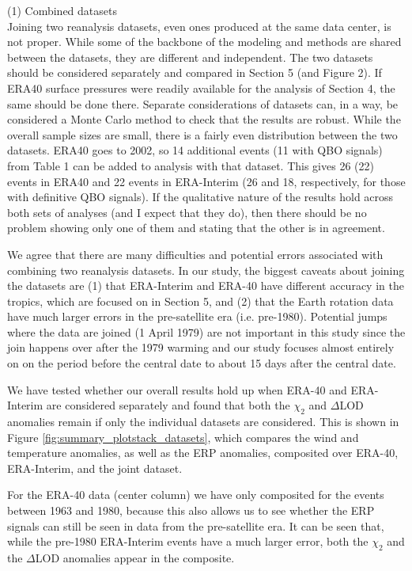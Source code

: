 \documentclass[a4paper,10pt]{article}
\begin{document}
\noindent \textcolor{reviewer}{(1) Combined datasets \\
Joining two reanalysis datasets, even ones produced at the same data center, is not proper. While some of the backbone of the modeling and methods are shared between the datasets, they are different and independent. The two datasets should be considered separately and compared in Section 5 (and Figure 2). If ERA40 surface pressures were readily available for the analysis of Section 4, the same should be done there. Separate considerations of datasets can, in a way, be considered a Monte Carlo method to check that the results are robust. While the overall sample sizes are small, there is a fairly even distribution between the two datasets. ERA40 goes to 2002, so 14 additional events (11 with QBO signals) from Table 1 can be added to analysis with that dataset. This gives 26 (22) events in ERA40 and 22 events in ERA-Interim (26 and 18, respectively, for those with definitive QBO signals). If the qualitative nature of the results hold across both sets of analyses (and I expect that
they do), then there should be no problem showing only one of them and stating that the other is in agreement.}
\vspace{0.5cm}

We agree that there are many difficulties and potential errors associated with combining two reanalysis datasets.
In our study, the biggest caveats about joining the datasets are (1) that ERA-Interim and ERA-40 have different accuracy in the tropics, which are focused on in Section 5, and (2) that the Earth rotation data have much larger errors in the pre-satellite era (i.e. pre-1980).  Potential jumps where the data are joined (1 April 1979) are not important in this study since the join happens over after the 1979 warming and our study focuses almost entirely on on the period before the central date to about 15 days after the central date.  

We have tested whether our overall results hold up when ERA-40 and ERA-Interim are considered separately and found that both the $\chi_2$ and $\Delta$LOD anomalies remain if only the individual datasets are considered.
This is shown in Figure \ref{fig:summary_plotstack_datasets}, which compares the wind and temperature anomalies, as well as the ERP anomalies, composited over ERA-40, ERA-Interim, and the joint dataset.

For the ERA-40 data (center column) we have only composited for the events between 1963 and 1980, because this also allows us to see whether the ERP signals can still be seen in data from the pre-satellite era.
It can be seen that, while the pre-1980 ERA-Interim events have a much larger error, both the $\chi_2$ and the $\Delta$LOD anomalies appear in the composite.
\end{document}
